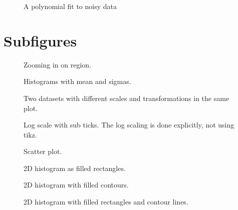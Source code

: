 \documentclass{article}
\begin{document}
\begin{figure}[H]
  \centering
  
  \caption{A polynomial fit to noisy data}
\end{figure}

\section{Subfigures}
\label{sec:subfig}

\begin{figure}[H]
  \centering
  
  \caption{ Zooming in on region. }
\end{figure}

\begin{figure}[H]
  \centering
  
  \caption{ Histograms with mean and sigmas.}
\end{figure}

\begin{figure}[H]
  \centering
  
  \caption{ Two datasets with different scales and transformations in the same plot.}
\end{figure}

\begin{figure}[H]
  \centering
  
  \caption{ Log scale with sub ticks. The log scaling is done explicitly, not using tikz.}
\end{figure}

\begin{figure}[H]
  \centering
  
  \caption{Scatter plot.}
\end{figure}

\begin{figure}[H]
  \centering
  
  \caption{ 2D histogram as filled rectangles.}
\end{figure}

\begin{figure}[H]
  \centering
  
  \caption{ 2D histogram with filled contours.}
\end{figure}

\begin{figure}[H]
  \centering
  
  \caption{ 2D histogram  with filled rectangles and contour lines.}
\end{figure}
\end{document}
